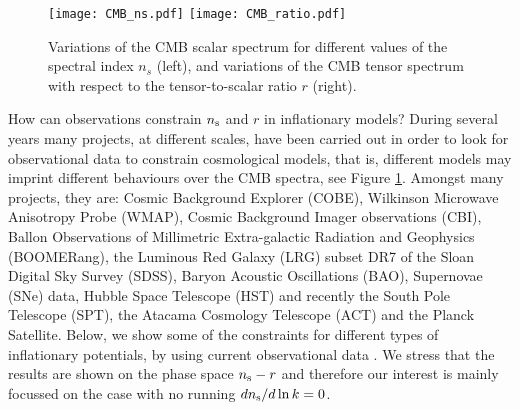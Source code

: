 \documentclass{rmaa}
\begin{document}
 \begin{figure}[t]
 \begin{center}
  \texttt{[image: CMB\_ns.pdf]}
  \texttt{[image: CMB\_ratio.pdf]}
	\caption{Variations
	of the CMB scalar spectrum for different values of the spectral index $n_s$ (left), 
	and variations of the CMB tensor spectrum with respect to the tensor-to-scalar ratio $r$ (right).}
	\label{fig:CMB_spectra}
 \end{center}	
\end{figure}

How can observations constrain $n_{\rm s}$ and $r$ in inflationary models?
During several years many projects, at different scales, have been carried 
out in order to look for observational data to constrain cosmological models, that
is, different models may imprint different behaviours over the CMB spectra, see Figure \ref{fig:CMB_spectra}.
Amongst many projects, they are:  
Cosmic Background Explorer (COBE), Wilkinson Microwave Anisotropy Probe (WMAP),
Cosmic Background Imager observations (CBI), Ballon Observations of Millimetric Extra-galactic 
Radiation and Geophysics (BOOMERang), the Luminous Red Galaxy (LRG) subset DR7 of the Sloan
Digital Sky Survey (SDSS), Baryon Acoustic Oscillations (BAO), Supernovae (SNe) data, 
Hubble Space Telescope (HST) and recently the South Pole Telescope (SPT), the 
Atacama Cosmology Telescope (ACT) and the Planck Satellite.
Below, we show some of the constraints for different types of inflationary potentials, 
by using current observational data \citep{Mortonson11}.
We stress that the results are shown on the 
phase space $n_{\rm s}-r$ and therefore our interest is mainly focussed 
on the case with no running $dn_{\rm s}/d\ln k =0$.
 \\
 
\end{document}
